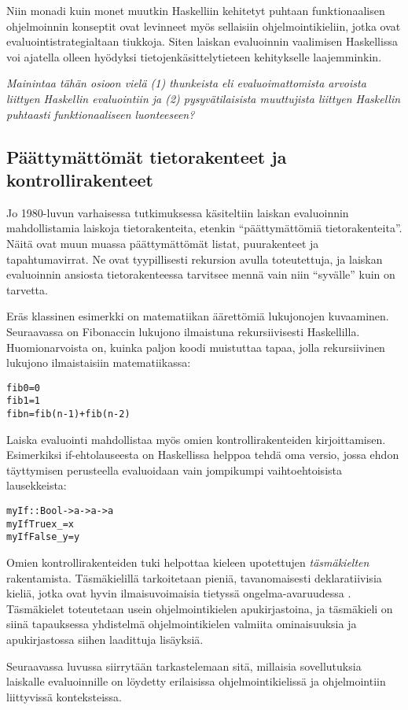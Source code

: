 Niin monadi kuin monet muutkin Haskelliin kehitetyt puhtaan funktionaalisen ohjelmoinnin konseptit ovat levinneet myös sellaisiin ohjelmointikieliin, jotka ovat evaluointistrategialtaan tiukkoja. Siten laiskan evaluoinnin vaalimisen Haskellissa voi ajatella olleen hyödyksi tietojenkäsittelytieteen kehitykselle laajemminkin.

\textit{Mainintaa tähän osioon vielä (1) thunkeista eli evaluoimattomista arvoista liittyen Haskellin evaluointiin ja (2) pysyvätilaisista muuttujista liittyen Haskellin puhtaasti funktionaaliseen luonteeseen? }

\subsection{Päättymättömät tietorakenteet ja kontrollirakenteet}

Jo 1980-luvun varhaisessa tutkimuksessa käsiteltiin laiskan evaluoinnin mahdollistamia laiskoja tietorakenteita, etenkin ``päättymättömiä tietorakenteita''. Näitä ovat muun muassa päättymättömät listat, puurakenteet ja tapahtumavirrat. Ne ovat tyypillisesti rekursion avulla toteutettuja, ja laiskan evaluoinnin ansiosta tietorakenteessa tarvitsee mennä vain niin ``syvälle'' kuin on tarvetta.

\newpage

Eräs klassinen esimerkki on matematiikan äärettömiä lukujonojen kuvaaminen. Seuraavassa on Fibonaccin lukujono ilmaistuna rekursiivisesti Haskellilla. Huomionarvoista on, kuinka paljon koodi muistuttaa tapaa, jolla rekursiivinen lukujono ilmaistaisiin matematiikassa:

\begin{alltt}
fib 0 = 0
fib 1 = 1
fib n = fib (n-1) + fib (n-2)
\end{alltt}

Laiska evaluointi mahdollistaa myös omien kontrollirakenteiden kirjoittamisen. Esimerkiksi if-ehtolauseesta on Haskellissa helppoa tehdä oma versio, jossa ehdon täyttymisen perusteella evaluoidaan vain jompikumpi vaihtoehtoisista lausekkeista:

\begin{alltt}
% Käyttö: myIf condition onTrue onFalse
myIf :: Bool -> a -> a -> a
myIf True  x _ = x
myIf False _ y = y
\end{alltt}

Omien kontrollirakenteiden tuki helpottaa kieleen upotettujen \textit{täsmäkielten} rakentamista. Täsmäkielillä tarkoitetaan pieniä, tavanomaisesti deklaratiivisia kieliä, jotka ovat hyvin ilmaisuvoimaisia tietyssä ongelma-avaruudessa \citep{van2000domain}. Täsmäkielet toteutetaan usein ohjelmointikielen apukirjastoina, ja täsmäkieli on siinä tapauksessa yhdistelmä ohjelmointikielen valmiita ominaisuuksia ja apukirjastossa siihen laadittuja lisäyksiä.

Seuraavassa luvussa siirrytään tarkastelemaan sitä, millaisia sovellutuksia laiskalle evaluoinnille on löydetty erilaisissa ohjelmointikielissä ja ohjelmointiin liittyvissä \mbox{konteksteissa.}
